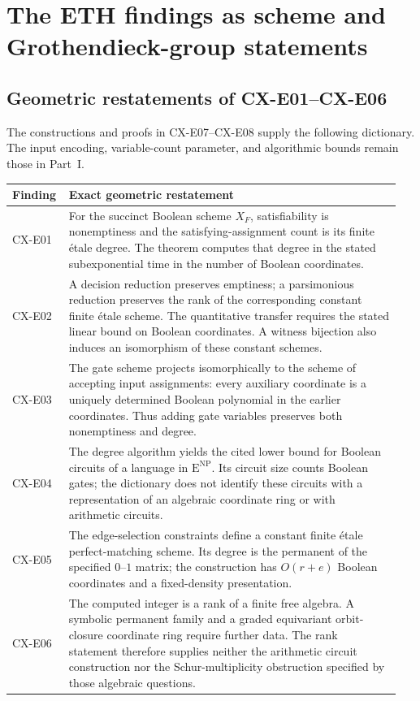 \section{The ETH findings as scheme and Grothendieck-group statements}
\label{sec:eth-geometric}

\subsection{Geometric restatements of CX-E01--CX-E06}

The constructions and proofs in CX-E07--CX-E08 supply the following
dictionary. The input encoding, variable-count parameter, and
algorithmic bounds remain those in Part~I.

\begin{longtable}{@{}p{0.12\linewidth}p{0.83\linewidth}@{}}
\hline
Finding & Exact geometric restatement\\
\hline
CX-E01 &
For the succinct Boolean scheme \(X_F\), satisfiability is
nonemptiness and the satisfying-assignment count is its finite
étale degree. The theorem computes that degree in the stated
subexponential time in the number of Boolean coordinates.\\[4pt]
CX-E02 &
A decision reduction preserves emptiness; a parsimonious reduction
preserves the rank of the corresponding constant finite étale
scheme. The quantitative transfer requires the stated linear bound
on Boolean coordinates. A witness bijection also induces an
isomorphism of these constant schemes.\\[4pt]
CX-E03 &
The gate scheme projects isomorphically to the scheme of accepting
input assignments: every auxiliary coordinate is a uniquely
determined Boolean polynomial in the earlier coordinates.
Thus adding gate variables preserves both nonemptiness and degree.\\[4pt]
CX-E04 &
The degree algorithm yields the cited lower bound for Boolean
circuits of a language in \(\mathrm E^{\mathrm{NP}}\).
Its circuit size counts Boolean gates; the dictionary does not
identify these circuits with a representation of an algebraic
coordinate ring or with arithmetic circuits.\\[4pt]
CX-E05 &
The edge-selection constraints define a constant finite étale
perfect-matching scheme. Its degree is the permanent of the
specified \(0\)--\(1\) matrix; the construction has \(O(r+e)\)
Boolean coordinates and a fixed-density presentation.\\[4pt]
CX-E06 &
The computed integer is a rank of a finite free algebra.
A symbolic permanent family and a graded equivariant
orbit-closure coordinate ring require further data.
The rank statement therefore supplies neither the arithmetic
circuit construction nor the Schur-multiplicity obstruction
specified by those algebraic questions.\\
\hline
\end{longtable}


